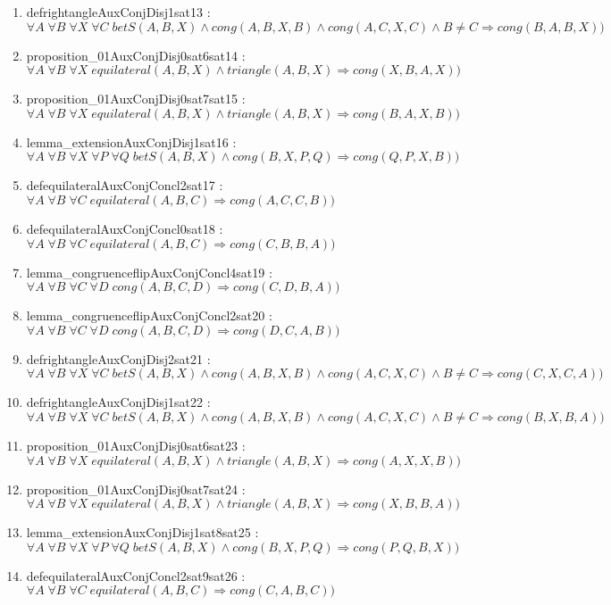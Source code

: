 \documentclass{article}
\begin{document}
\begin{enumerate}
\item defrightangleAuxConjDisj1sat13 : $\forall A\;\forall B\;\forall X\;\forall C\;betS(A, B, X)\wedge cong(A, B, X, B)\wedge cong(A, C, X, C)\wedge B \neq C \Rightarrow cong(B, A, B, X))$
\item proposition\_01AuxConjDisj0sat6sat14 : $\forall A\;\forall B\;\forall X\;equilateral(A, B, X)\wedge triangle(A, B, X) \Rightarrow cong(X, B, A, X))$
\item proposition\_01AuxConjDisj0sat7sat15 : $\forall A\;\forall B\;\forall X\;equilateral(A, B, X)\wedge triangle(A, B, X) \Rightarrow cong(B, A, X, B))$
\item lemma\_extensionAuxConjDisj1sat16 : $\forall A\;\forall B\;\forall X\;\forall P\;\forall Q\;betS(A, B, X)\wedge cong(B, X, P, Q) \Rightarrow cong(Q, P, X, B))$
\item defequilateralAuxConjConcl2sat17 : $\forall A\;\forall B\;\forall C\;equilateral(A, B, C) \Rightarrow cong(A, C, C, B))$
\item defequilateralAuxConjConcl0sat18 : $\forall A\;\forall B\;\forall C\;equilateral(A, B, C) \Rightarrow cong(C, B, B, A))$
\item lemma\_congruenceflipAuxConjConcl4sat19 : $\forall A\;\forall B\;\forall C\;\forall D\;cong(A, B, C, D) \Rightarrow cong(C, D, B, A))$
\item lemma\_congruenceflipAuxConjConcl2sat20 : $\forall A\;\forall B\;\forall C\;\forall D\;cong(A, B, C, D) \Rightarrow cong(D, C, A, B))$
\item defrightangleAuxConjDisj2sat21 : $\forall A\;\forall B\;\forall X\;\forall C\;betS(A, B, X)\wedge cong(A, B, X, B)\wedge cong(A, C, X, C)\wedge B \neq C \Rightarrow cong(C, X, C, A))$
\item defrightangleAuxConjDisj1sat22 : $\forall A\;\forall B\;\forall X\;\forall C\;betS(A, B, X)\wedge cong(A, B, X, B)\wedge cong(A, C, X, C)\wedge B \neq C \Rightarrow cong(B, X, B, A))$
\item proposition\_01AuxConjDisj0sat6sat23 : $\forall A\;\forall B\;\forall X\;equilateral(A, B, X)\wedge triangle(A, B, X) \Rightarrow cong(A, X, X, B))$
\item proposition\_01AuxConjDisj0sat7sat24 : $\forall A\;\forall B\;\forall X\;equilateral(A, B, X)\wedge triangle(A, B, X) \Rightarrow cong(X, B, B, A))$
\item lemma\_extensionAuxConjDisj1sat8sat25 : $\forall A\;\forall B\;\forall X\;\forall P\;\forall Q\;betS(A, B, X)\wedge cong(B, X, P, Q) \Rightarrow cong(P, Q, B, X))$
\item defequilateralAuxConjConcl2sat9sat26 : $\forall A\;\forall B\;\forall C\;equilateral(A, B, C) \Rightarrow cong(C, A, B, C))$

\end{enumerate}
\end{document}
